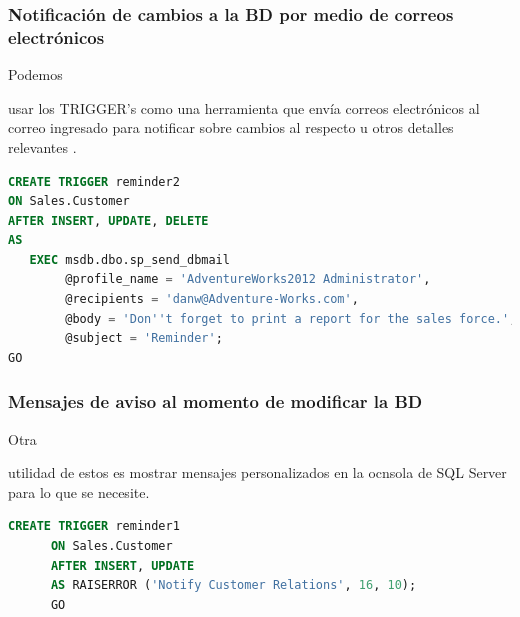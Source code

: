 \documentclass[stu, 12pt, letterpaper, donotrepeattitle, floatsintext, natbib]{apa7}
\begin{document}
    \subsubsection*{Notificación de cambios a la BD por medio de correos electrónicos}
    Podemos \begin{justifying}
      usar los TRIGGER's como una herramienta que envía correos electrónicos al correo ingresado para
    notificar sobre cambios al respecto u otros detalles relevantes \citep{unknown-author-2021}.\par
    \end{justifying}
    \vspace{\baselineskip}
    \begin{lstlisting}[language=SQL]
CREATE TRIGGER reminder2  
ON Sales.Customer  
AFTER INSERT, UPDATE, DELETE   
AS  
   EXEC msdb.dbo.sp_send_dbmail  
        @profile_name = 'AdventureWorks2012 Administrator',  
        @recipients = 'danw@Adventure-Works.com',  
        @body = 'Don''t forget to print a report for the sales force.',  
        @subject = 'Reminder';  
GO\end{lstlisting}
    \subsubsection*{Mensajes de aviso al momento de modificar la BD}
    Otra \begin{justifying}
      utilidad de estos es mostrar mensajes personalizados en la ocnsola de SQL Server para lo que se necesite.\par
    \end{justifying}
    \vspace{\baselineskip}
    \begin{lstlisting}[language=SQL]
      CREATE TRIGGER reminder1  
      ON Sales.Customer  
      AFTER INSERT, UPDATE   
      AS RAISERROR ('Notify Customer Relations', 16, 10);  
      GO
    \end{lstlisting}
    
    \newpage   
    \renewcommand\refname{\textbf{Referencias}}
    
\end{document}
